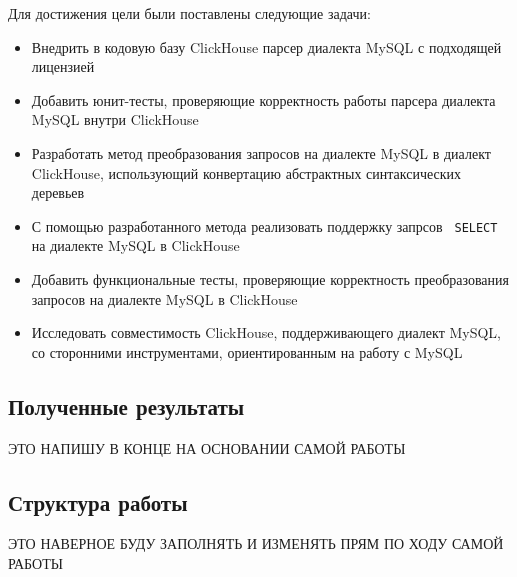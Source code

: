 Для достижения цели были поставлены следующие задачи:
\begin{itemize}
  \item Внедрить в кодовую базу ClickHouse парсер диалекта MySQL с подходящей лицензией
  \item Добавить юнит-тесты, проверяющие корректность работы парсера диалекта MySQL внутри ClickHouse
  \item Разработать метод преобразования запросов на диалекте MySQL в диалект ClickHouse, использующий конвертацию абстрактных синтаксических деревьев
  \item С помощью разработанного метода реализовать поддержку запрсов \texttt{ SELECT } на диалекте MySQL в ClickHouse
  \item Добавить функциональные тесты, проверяющие корректность преобразования запросов на диалекте MySQL в ClickHouse
  \item Исследовать совместимость ClickHouse, поддерживающего диалект MySQL, со сторонними инструментами, ориентированным на работу с MySQL
\end{itemize}

\subsection{Полученные результаты}
ЭТО НАПИШУ В КОНЦЕ НА ОСНОВАНИИ САМОЙ РАБОТЫ

\subsection{Структура работы}
ЭТО НАВЕРНОЕ БУДУ ЗАПОЛНЯТЬ И ИЗМЕНЯТЬ ПРЯМ ПО ХОДУ САМОЙ РАБОТЫ
